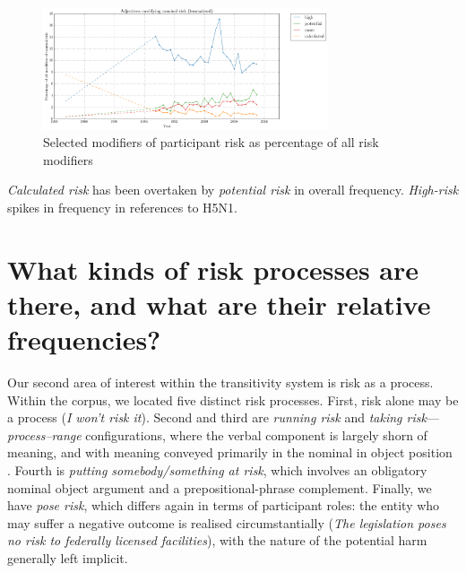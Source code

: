

\begin{figure}%
\centering
\includegraphics[width=0.75\textwidth]{../images/adjectives_modifying_nominal_risk_(lemmatised).png}
\caption{Selected modifiers of participant risk as percentage of all risk modifiers}
\label{fig:reladjrisk}
\end{figure}


\vspace{5mm}\noindent\begin{tcolorbox}[colback=yellow!5,colframe=yellow!40!black,title=Summary: modifiers of risk as participant]
\parbox{1\textwidth}{%
\emph{Calculated risk} has been overtaken by \emph{potential risk} in overall frequency. \emph{High-risk} spikes in frequency in references to H5N1.}
\end{tcolorbox}
\vspace{5mm}


\section{What kinds of risk processes are there, and what are their relative frequencies?} \FloatBarrier

Our second area of interest within the transitivity system is risk as a process. Within the corpus, we located five distinct risk processes. First, risk alone may be a process (\emph{I won't risk it}). Second and third are \emph{running risk} and \emph{taking risk}---\emph{process--range} configurations, where the verbal component is largely shorn of meaning, and with meaning conveyed primarily in the nominal in object position \cite{halliday_introduction_2004}. Fourth is \emph{putting somebody/something at risk}, which involves an obligatory nominal object argument and a prepositional-phrase complement. Finally, we have \emph{pose risk}, which differs again in terms of participant roles: the entity who may suffer a negative outcome is realised circumstantially (\emph{The legislation poses no risk to federally licensed facilities}), with the nature of the potential harm generally left implicit.

